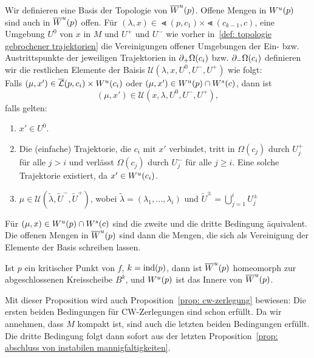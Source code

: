 \begin{definition}
    Wir definieren eine Basis der Topologie von ${ \overline{W}^u } (p)$. Offene Mengen in ${ W^u } (p)$ sind 
    auch in ${ \overline{W}^u } (p)$ offen. Für $(\lambda, x) \in \Lt (p, c_1) \times \Lt (c_{k - 1}, c)$,
    eine Umgebung $U^0$ von $x$ in $M$ und $U^+$ und $U^-$ wie vorher 
    in~\ref{def: topologie gebrochener trajektorien} die Vereinigungen offener Umgebungen der Ein-
    bzw. Austrittspunkte der jeweiligen Trajektorien in ${ \partial }_+ \Omega (c_i)$ bzw. 
    ${ \partial }_- \Omega (c_i)$ definieren wir die restlichen Elemente der Baisis
    $\mathcal{U}(\lambda, x, U^0, U^-, U^+)$ wie folgt: \\
    Falls $(\mu, x') \in {\overline{\mathcal{L}} }(p, c_i) \times { W^u } (c_i)$ oder $(\mu, x') \in W^u (p) \cap { W^s } (c)$, 
    dann ist \[ (\mu, x') \in \mathcal{U}(x, \lambda, U^0, U^-, U^+) , \]
    falls gelten:
    \begin{enumerate}
        \item $x' \in U^0$.
        \item Die (einfache) Trajektorie, die $c_i$ mit $x'$ verbindet, tritt in $\Omega (c_j)$ durch 
            $U^+_j$ für alle $j > i$ und verlässt $\Omega (c_j)$ durch $U^-_j$ für alle $j \geq i$.
            Eine solche Trajektorie existiert, da $x' \in { W^u } (c_i)$.
        \item $\mu \in \mathcal{U}(\tilde{\lambda}, \tilde{U}^-, \tilde{U}^+)$, wobei 
            $\tilde{\lambda} = (\lambda_1, \dots, \lambda_i)$ und 
            $\tilde{U}^{\pm} = \bigcup_{j = 1}^i U^{\pm}_j$
    \end{enumerate}
    Für $(\mu, x) \in { W^u }(p) \cap { W^s } (c)$ sind die zweite und die dritte Bedingung äquivalent.
    Die offenen Mengen in ${ \overline{W}^u } (p)$ sind dann die Mengen, die sich als Vereinigung der 
    Elemente der Basis schreiben lassen. 
\end{definition}

\begin{example}
    \todo{}
\end{example}

\begin{prop}
    \label{prop: abschluss von instabilen mannigfaltigkeiten}
    Ist $p$ ein kritischer Punkt von $f$, $k = { \operatorname{ind} } (p)$, dann ist ${ \overline{W}^u } (p)$ homeomorph 
    zur abgeschlossenen Kreisscheibe $B^k$, und ${ W^u } (p)$ ist das Innere von ${ \overline{W}^u } (p)$.
\end{prop}

\begin{remark}
    Mit dieser Proposition wird auch Proposition~\ref{prop: cw-zerlegung} bewiesen:
    Die ersten beiden Bedingungen für CW-Zerlegungen sind schon erfüllt. Da wir annehmen, dass 
    $M$ kompakt ist, sind auch die letzten beiden Bedingungen erfüllt. Die dritte Bedingung folgt
    dann sofort aus der letzten Proposition~\ref{prop: abschluss von instabilen mannigfaltigkeiten}.
\end{remark}


